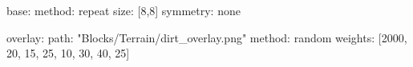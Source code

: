 base:
  method: repeat
  size: [8,8]
  symmetry: none

overlay:
  path: "Blocks/Terrain/dirt_overlay.png"
  method: random
  weights: [2000, 20, 15, 25, 10, 30, 40, 25]

